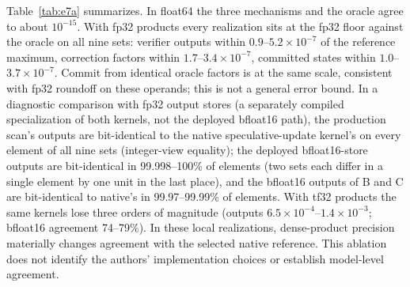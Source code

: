 \documentclass[conference]{IEEEtran}
\begin{document}
Table~\ref{tab:e7a} summarizes. In float64 the three mechanisms and the oracle agree to about $10^{-15}$. With fp32 products every realization sits at the fp32 floor against the oracle on all nine sets: verifier outputs within $0.9$--$5.2\times10^{-7}$ of the reference maximum, correction factors within $1.7$--$3.4\times10^{-7}$, committed states within $1.0$--$3.7\times10^{-7}$. Commit from identical oracle factors is at the same scale, consistent with fp32 roundoff on these operands; this is not a general error bound. In a diagnostic comparison with fp32 output stores (a separately compiled specialization of both kernels, not the deployed bfloat16 path), the production scan's outputs are bit-identical to the native speculative-update kernel's on every element of all nine sets (integer-view equality); the deployed bfloat16-store outputs are bit-identical in 99.998--100\% of elements (two sets each differ in a single element by one unit in the last place), and the bfloat16 outputs of B and C are bit-identical to native's in 99.97--99.99\% of elements. With tf32 products the same kernels lose three orders of magnitude (outputs $6.5\times10^{-4}$--$1.4\times10^{-3}$; bfloat16 agreement 74--79\%). In these local realizations, dense-product precision materially changes agreement with the selected native reference. This ablation does not identify the authors' implementation choices or establish model-level agreement.
\end{document}
